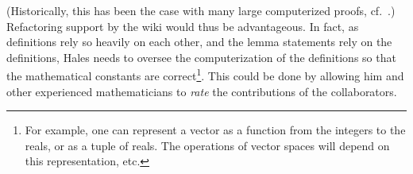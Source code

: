 \begin{contribution}
  (Historically, this has been the case with many large computerized
proofs, cf.~\cite{Gonthier:2005:FourColor}.)  Refactoring support by the wiki
would thus be advantageous.  In fact, as definitions rely so heavily on each
other, and the lemma statements rely on the definitions, Hales needs to oversee
the computerization of the definitions so that the mathematical constants are
correct\footnote{For example, one can represent a vector as a function from the
  integers to the reals, or as a tuple of reals.  The operations of vector
  spaces will depend on this representation, etc.}.  This could be done by
allowing him and other experienced mathematicians to \emph{rate} the
contributions of the collaborators.
\end{contribution}

